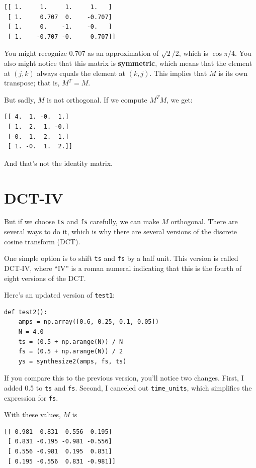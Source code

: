 \documentclass[12pt]{book}
\begin{document}
\begin{verbatim}
[[ 1.     1.     1.     1.   ]
 [ 1.     0.707  0.    -0.707]
 [ 1.     0.    -1.    -0.   ]
 [ 1.    -0.707 -0.     0.707]]
\end{verbatim}

You might recognize 0.707 as an approximation of $\sqrt{2}/2$,
which is $\cos \pi/4$.  You also might notice that this matrix
is {\bf symmetric}, which means that the element at $(j, k)$ always
equals the element at $(k, j)$.  This implies that $M$ is its own
transpose; that is, $M^T = M$.

But sadly, $M$ is not orthogonal.  If we compute $M^TM$, we get:

\begin{verbatim}
[[ 4.  1. -0.  1.]
 [ 1.  2.  1. -0.]
 [-0.  1.  2.  1.]
 [ 1. -0.  1.  2.]]
\end{verbatim}

And that's not the identity matrix.


\section{DCT-IV}
\label{dctiv}

But if we choose {\tt ts} and {\tt fs} carefully,
we can make $M$ orthogonal.  There are several ways to do it, which
is why there are several versions of the discrete cosine transform (DCT).

One simple option is to shift {\tt ts} and {\tt fs} by a half unit.
This version is called DCT-IV, where ``IV'' is a roman numeral
indicating that this is the fourth of eight versions of the DCT.

Here's an updated version of {\tt test1}:

\begin{verbatim}
def test2():
    amps = np.array([0.6, 0.25, 0.1, 0.05])
    N = 4.0
    ts = (0.5 + np.arange(N)) / N
    fs = (0.5 + np.arange(N)) / 2
    ys = synthesize2(amps, fs, ts)
\end{verbatim}

If you compare this to the previous version, you'll notice
two changes.  First, I added 0.5 to {\tt ts} and {\tt fs}.
Second, I canceled out \verb"time_units", which simplifies
the expression for {\tt fs}.

With these values, $M$ is

\begin{verbatim}
[[ 0.981  0.831  0.556  0.195]
 [ 0.831 -0.195 -0.981 -0.556]
 [ 0.556 -0.981  0.195  0.831]
 [ 0.195 -0.556  0.831 -0.981]]
\end{verbatim}
\end{document}
